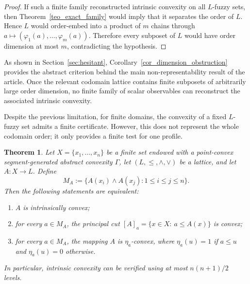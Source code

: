 \documentclass[11pt,a4paper]{article}
\newtheorem{theorem}{Theorem}
\begin{document}
\begin{proof}
If such a finite family reconstructed intrinsic convexity on all \(L\)-fuzzy sets, then Theorem~\ref{teo_exact_family} would imply that it separates the order of \(L\). Hence \(L\) would order-embed into a product of \(m\) chains through \(a\mapsto(\varphi_1(a),\ldots,\varphi_m(a))\). Therefore every subposet of \(L\) would have order dimension at most \(m\), contradicting the hypothesis.
\end{proof}


As shown in Section~\ref{sec:hesitant}, Corollary~\ref{cor_dimension_obstruction} provides the abstract criterion behind the main non-representability result of the article. Once the relevant codomain lattice contains finite subposets of arbitrarily large order dimension, no finite family of scalar observables can reconstruct the associated intrinsic convexity.



\smallskip

Despite the previous limitation, for finite domains, the convexity of a fixed \(L\)-fuzzy set admits a finite certificate. However, this does not represent the whole codomain order; it only provides a finite test for one profile.


\begin{theorem}\label{teo_finite}
Let \(X=\{x_1,\ldots,x_n\}\) be a finite set endowed with a point-convex segment-generated abstract convexity \(\Gamma\), let \((L,\leq,\wedge,\vee)\) be a lattice, and let \(A:X\to L\). Define
\begin{equation*}
M_A:=\{A(x_i)\wedge A(x_j): 1\le i\le j\le n\}.
\end{equation*}
Then the following statements are equivalent:
\begin{enumerate}
    \item \(A\) is intrinsically convex;
    \item for every \(a\in M_A\), the principal cut \([A]_a=\{x\in X:\ a\le A(x)\}\) is convex;
    \item for every \(a\in M_A\), the mapping \(A\) is \(\eta_a\)-convex, where \(\eta_a(u)=1\) if \(a\le u\) and \(\eta_a(u)=0\) otherwise.
\end{enumerate}
In particular, intrinsic convexity can be verified using at most \(n(n+1)/2\) levels.
\end{theorem}
\end{document}
